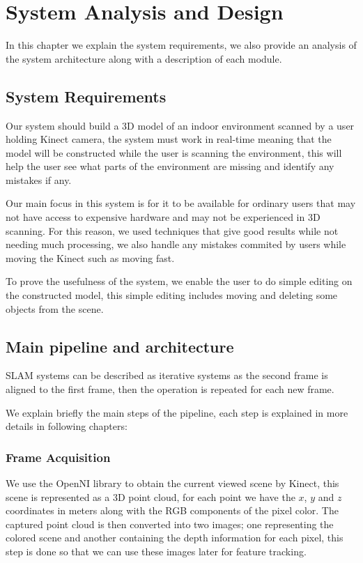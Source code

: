 \chapter{System Analysis and Design}

In this chapter we explain the system requirements, we also provide an analysis of the system architecture along with a description of each module.

\section{System Requirements}

Our system should build a 3D model of an indoor environment scanned by a user holding Kinect camera, the system must work in real-time meaning that the model will be constructed while the user is scanning the environment, this will help the user see what parts of the environment are missing and identify any mistakes if any.

Our main focus in this system is for it to be available for ordinary users that may not have access to expensive hardware and may not be experienced in 3D scanning. For this reason, we used techniques that give good results while not needing much processing, we also handle any mistakes commited by users while moving the Kinect such as moving fast.

To prove the usefulness of the system, we enable the user to do simple editing on the constructed model, this simple editing includes moving and deleting some objects from the scene.
\pagebreak

\section{Main pipeline and architecture}

SLAM systems can be described as iterative systems as the second frame is aligned to the first frame, then the operation is repeated for each new frame.

We explain briefly the main steps of the pipeline, each step is explained in more details in following chapters:

\subsection{Frame Acquisition}
   We use the OpenNI library to obtain the current viewed scene by Kinect, this scene is represented as a 3D point cloud, for each point we have the $x$, $y$ and $z$ coordinates in meters along with the RGB components of the pixel color.
   The captured point cloud is then converted into two images; one representing the colored scene and another containing the depth information for each pixel, this step is done so that we can use these images later for feature tracking.

